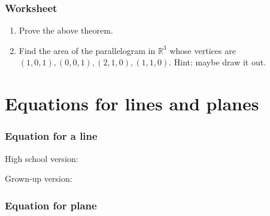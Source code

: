 \documentclass[aspectratio=169]{beamer}
\begin{document}
\begin{frame}
    \frametitle{Worksheet}
    \begin{enumerate}
        \item Prove the above theorem.
        \item Find the area of the parallelogram in $\mathbb{R}^3$ whose
            vertices are $(1,0,1), (0,0,1), (2,1,0), (1,1,0)$.
            Hint: maybe draw it out.
    \end{enumerate}
\end{frame}


\section{Equations for lines and planes}

\begin{frame}
    \frametitle{Equation for a line}
    High school version:

    \vspace{2cm}
    \pause
    Grown-up version:
\end{frame}



\begin{frame}
    \frametitle{Equation for plane}
\end{frame}
\end{document}
